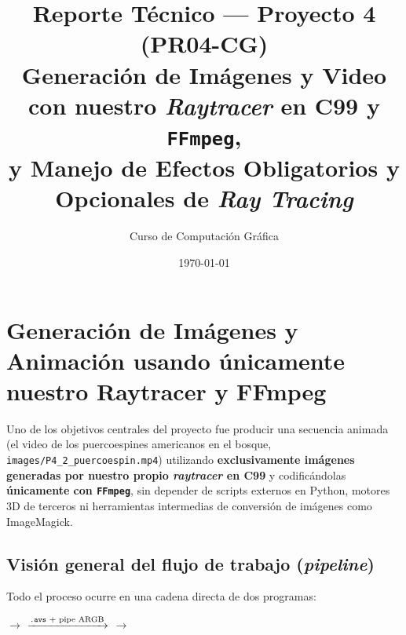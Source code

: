 \documentclass[11pt,letterpaper]{article}
\title{\textbf{Reporte Técnico — Proyecto 4 (PR04-CG)}\\[0.4em]
\large Generación de Imágenes y Video con nuestro \textit{Raytracer} en C99 y \texttt{FFmpeg},\\
y Manejo de Efectos Obligatorios y Opcionales de \textit{Ray Tracing}}
\author{Curso de Computación Gráfica}
\date{\today}
\begin{document}
\maketitle
\tableofcontents
\newpage

\section{Generación de Imágenes y Animación usando únicamente nuestro Raytracer y FFmpeg}

Uno de los objetivos centrales del proyecto fue producir una secuencia animada (el video de los puercoespines americanos en el bosque, \texttt{images/P4\_2\_puercoespin.mp4}) utilizando \textbf{exclusivamente imágenes generadas por nuestro propio \textit{raytracer} en C99} y codificándolas \textbf{únicamente con \texttt{FFmpeg}}, sin depender de scripts externos en Python, motores 3D de terceros ni herramientas intermedias de conversión de imágenes como ImageMagick.

\subsection{Visión general del flujo de trabajo (\textit{pipeline})}

Todo el proceso ocurre en una cadena directa de dos programas:

\begin{center}
{\small
{} $\rightarrow$
 $\xrightarrow{\text{\texttt{.avs} + pipe ARGB}}$
 $\rightarrow$
}
\end{center}
\end{document}
